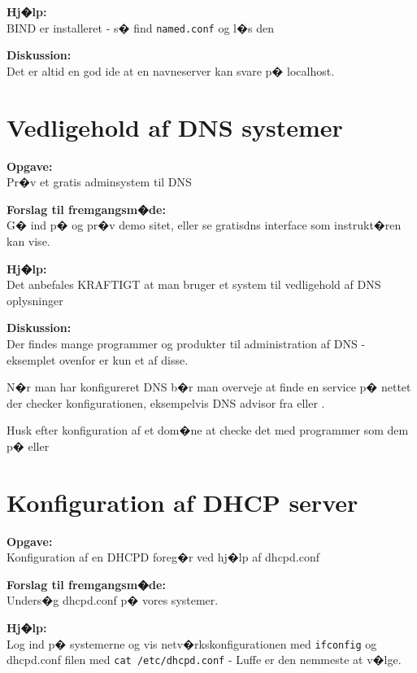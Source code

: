 \documentclass[a4paper,11pt,notitlepage]{oevelser}
\begin{document}
{\bfseries Hj�lp:}\\
BIND er installeret - s� find \verb+named.conf+ og l�s den

{\bfseries Diskussion:}\\
Det er altid en god ide at en navneserver kan svare p� localhost.


\chapter{Vedligehold af DNS systemer}
\label{ex:bind-dnszone}
{\bfseries Opgave:}\\
Pr�v et gratis adminsystem til DNS

{\bfseries Forslag til fremgangsm�de:}\\
G� ind p�  og pr�v demo sitet, eller
se gratisdns interface som instrukt�ren kan vise.

{\bfseries Hj�lp:}\\
Det anbefales KRAFTIGT at man bruger et system til vedligehold af
DNS oplysninger

{\bfseries Diskussion:}\\
Der findes mange programmer og produkter til administration af DNS -
eksemplet ovenfor er kun et af disse.

N�r man har konfigureret DNS b�r man overveje at finde en service p�
nettet der checker konfigurationen, eksempelvis DNS advisor fra
 eller .

Husk efter konfiguration af et dom�ne at checke det med programmer som dem p�
 eller 


\chapter{Konfiguration af DHCP server}
\label{ex:dhcpd-config}

{\bfseries Opgave:}\\
Konfiguration af en DHCPD foreg�r ved hj�lp af dhcpd.conf

{\bfseries Forslag til fremgangsm�de:}\\
Unders�g dhcpd.conf p� vores systemer.

{\bfseries Hj�lp:}\\
Log ind p� systemerne og vis netv�rkskonfigurationen med \verb+ifconfig+
og dhcpd.conf filen med \verb+cat /etc/dhcpd.conf+ - Luffe er den nemmeste at v�lge.
\end{document}

